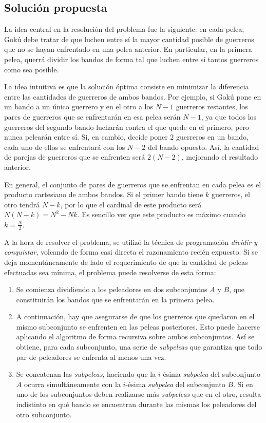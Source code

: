     \subsection{Solución propuesta}
        La idea central en la resolución del problema fue la siguiente: en cada pelea, Gokú debe tratar de que luchen entre sí la mayor cantidad posible de guerreros que no se hayan enfrentado en una pelea anterior. En particular, en la primera pelea, querrá dividir los bandos de forma tal que luchen entre sí tantos guerreros como sea posible.

        La idea intuitiva es que la solución óptima consiste en minimizar la diferencia entre las cantidades de guerreros de ambos bandos. Por ejemplo, si Gokú pone en un bando a un único guerrero y en el otro a los $N - 1$ guerreros restantes, los pares de guerreros que se enfrentarán en esa pelea serán $N - 1$, ya que todos los guerreros del segundo bando lucharán contra el que quede en el primero, pero nunca pelearán entre sí. Si, en cambio, decide poner $2$ guerreros en un bando, cada uno de ellos se enfrentará con los $N - 2$ del bando opuesto. Así, la cantidad de parejas de guerreros que se enfrenten será $2 (N - 2)$, mejorando el resultado anterior.
        
        En general, el conjunto de pares de guerreros que se enfrentan en cada pelea es el producto cartesiano de ambos bandos. Si el primer bando tiene $k$ guerreros, el otro tendrá $N - k$, por lo que el cardinal de este producto será $N (N - k) = N^2 - Nk$. Es sencillo ver que este producto es máximo cuando $k = \frac{N}{2}$.

        A la hora de resolver el problema, se utilizó la técnica de programación \emph{dividir y conquistar}, volcando de forma casi directa el razonamiento recién expuesto. Si se deja momentáneamente de lado el requerimiento de que la cantidad de peleas efectuadas sea mínima, el problema puede resolverse de esta forma:

        \begin{enumerate}
            \item Se comienza dividiendo a los peleadores en dos subconjuntos $A$ y $B$, que constituirán los bandos que se enfrentarán en la primera pelea.
            \item A continuación, hay que asegurarse de que los guerreros que quedaron en el mismo subconjunto se enfrenten en las peleas posteriores. Esto puede hacerse aplicando el algoritmo de forma recursiva sobre ambos subconjuntos. Así se obtiene, para cada subconjunto, una serie de \emph{subpeleas} que garantiza que todo par de peleadores se enfrenta al menos una vez.
            \item Se concatenan las \emph{subpeleas}, haciendo que la $i$-ésima \emph{subpelea} del subconjunto $A$ ocurra simultáneamente con la $i$-ésima \emph{subpelea} del subconjunto $B$. Si en uno de los subconjuntos deben realizarse más \emph{subpeleas} que en el otro, resulta indistinto en qué bando se encuentran durante las mismas los peleadores del otro subconjunto.
        \end{enumerate}

